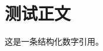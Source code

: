 \documentclass[UTF8]{ctexart}
\begin{document}
\section*{测试正文}

这是一条结构化数字引用\cite{verified2026}。



\end{document}
